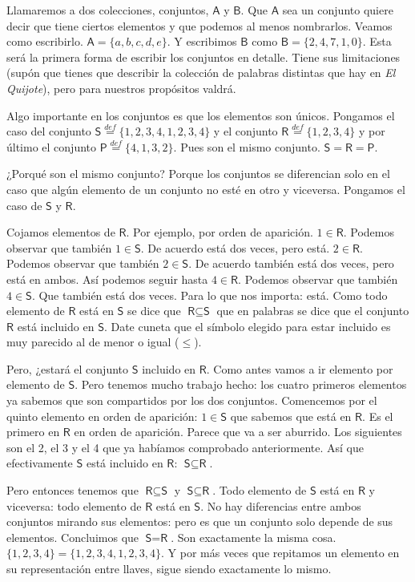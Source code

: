 \documentclass{amsart}
\theoremstyle{definition}
\theoremstyle{remark}
\numberwithin{equation}{section}
\newcommand{\setsymbol}[1]{\textsf{#1}}
\newcommand{\sA}{\setsymbol{A}}
\newcommand{\sB}{\setsymbol{B}}
\newcommand{\sP}{\setsymbol{P}}
\newcommand{\sR}{\setsymbol{R}}
\newcommand{\sS}{\setsymbol{S}}
\newcommand{\defin}{\overset {def}{=}}
\begin{document}
	
	Llamaremos a dos colecciones, conjuntos, $\sA$ y $\sB$. Que $\sA$ sea un
conjunto quiere decir que tiene ciertos elementos y que podemos al menos
nombrarlos. Veamos como escribirlo. $\sA = \{a , b , c , d , e \}$. Y
escribimos $\sB$ como $\sB = \{ 2 , 4 , 7 , 1 , 0 \}$. Esta será la primera
forma de escribir los conjuntos en detalle. Tiene sus limitaciones (supón que
tienes que describir la colección de palabras distintas que hay en \emph{El
Quijote}), pero para nuestros propósitos valdrá.
	
	
	Algo importante en los conjuntos es que los elementos son únicos.
Pongamos el caso del conjunto $\sS\defin\{1,2,3,4,1,2,3,4\}$ y el conjunto
$\sR\defin\{1,2,3,4\}$ y por último el conjunto $\sP\defin\{4,1,3,2\}$. Pues
son el mismo conjunto. $\sS = \sR = \sP$.
	
	
	¿Porqué son el mismo conjunto? Porque los conjuntos se diferencian solo
en el caso que algún elemento de un conjunto no esté en otro y viceversa.
Pongamos el caso de $\sS$ y $\sR$. 
	
	
	Cojamos elementos de $\sR$. Por ejemplo, por orden de aparición.
$1\in\sR$. Podemos observar que también $1\in\sS$. De acuerdo está dos veces,
pero está.  $2\in\sR$. Podemos observar que también $2\in\sS$. De acuerdo
también está dos veces, pero está en ambos. Así podemos seguir hasta
$4\in\sR$. Podemos observar que también $4\in\sS$. Que también está dos
veces. Para lo que nos importa: está. Como todo elemento de $\sR$ está en
$\sS$ se dice que $\sR\subseteq\sS$ que en palabras se dice que el conjunto
$\sR$ está incluido en $\sS$. Date cuneta que el símbolo elegido para estar
incluido es muy parecido al de menor o igual ($\leq$).
	
	
	Pero, ¿estará el conjunto $\sS$ incluido en $\sR$. Como antes vamos a ir
elemento por elemento de $\sS$. Pero tenemos mucho trabajo hecho: los cuatro
primeros elementos ya sabemos que son compartidos por los dos conjuntos.
Comencemos por el quinto elemento en orden de aparición: $1\in\sS$ que
sabemos que está en $\sR$. Es el primero en $\sR$ en orden de aparición.
Parece que va a ser aburrido. Los siguientes son el 2, el 3 y el 4 que ya
habíamos comprobado anteriormente. Así que efectivamente $\sS$ está incluido
en $\sR$: $\sS\subseteq\sR$.
	
	
	Pero entonces tenemos que $\sR\subseteq\sS$ y $\sS\subseteq\sR$. Todo
elemento de $\sS$ está en $\sR$ y viceversa: todo elemento de $\sR$ está en
$\sS$. No hay diferencias entre ambos conjuntos mirando sus elementos: pero
es que un conjunto solo depende de sus elementos. Concluimos que $\sS=\sR$.
Son exactamente la misma cosa. $\{1,2,3,4\}=\{1,2,3,4,1,2,3,4\}$. Y por más
veces que repitamos un elemento en su representación entre llaves, sigue
siendo exactamente lo mismo.
	
\end{document}
